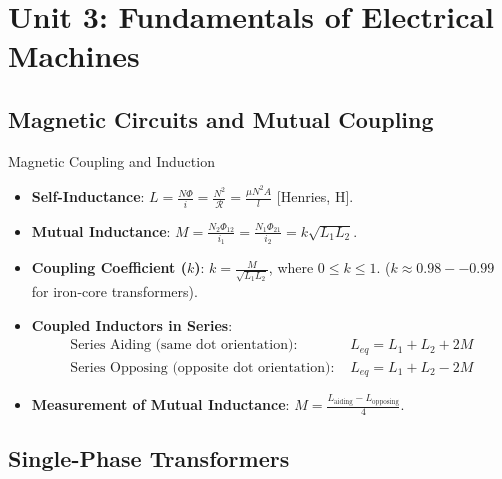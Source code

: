 \chapter{Unit 3: Fundamentals of Electrical Machines}

\section{Magnetic Circuits and Mutual Coupling}

\begin{formulabox}{Magnetic Coupling and Induction}
\begin{itemize}[leftmargin=1.5em]
    \item \textbf{Self-Inductance}: $L = \frac{N \Phi}{i} = \frac{N^2}{\mathcal{R}} = \frac{\mu N^2 A}{l}$ [Henries, H].
    \item \textbf{Mutual Inductance}: $M = \frac{N_2 \Phi_{12}}{i_1} = \frac{N_1 \Phi_{21}}{i_2} = k\sqrt{L_1 L_2}$.
    \item \textbf{Coupling Coefficient ($k$)}: $k = \frac{M}{\sqrt{L_1 L_2}}$, where $0 \le k \le 1$. ($k \approx 0.98--0.99$ for iron-core transformers).
    \item \textbf{Coupled Inductors in Series}:
    \begin{align*}
        \text{Series Aiding (same dot orientation): } & L_{eq} = L_1 + L_2 + 2M \\
        \text{Series Opposing (opposite dot orientation): } & L_{eq} = L_1 + L_2 - 2M
    \end{align*}
    \item \textbf{Measurement of Mutual Inductance}: $M = \frac{L_{\text{aiding}} - L_{\text{opposing}}}{4}$.
\end{itemize}
\end{formulabox}

\section{Single-Phase Transformers}

